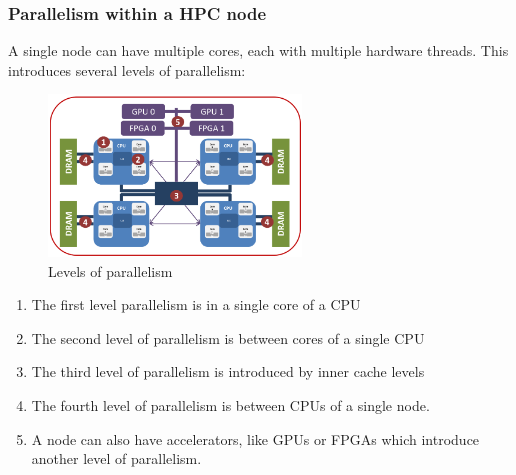 \subsubsection{Parallelism within a HPC node}

A single node can have multiple cores, each with multiple hardware threads. This introduces several levels of parallelism:

\begin{figure}[H]
    \centering
    \includegraphics[width=0.6\textwidth]{assets/parallelism.png}
    \caption{Levels of parallelism}
    \label{fig:parallelism}
\end{figure}

\begin{enumerate}
    \item The first level parallelism is in a single core of a CPU
    \item The second level of parallelism is between cores of a single CPU
    \item The third level of parallelism is introduced by inner cache levels
    \item The fourth level of parallelism is between CPUs of a single node.
    \item A node can also have accelerators, like GPUs or FPGAs which introduce another level of parallelism.
\end{enumerate}